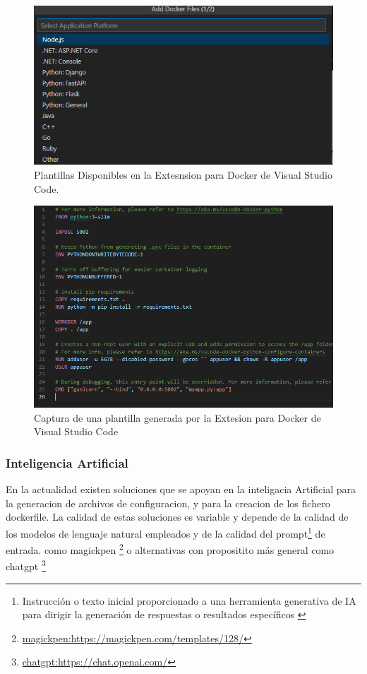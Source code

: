 \documentclass[12pt, a4paper, twoside]{article}
\begin{document}
\begin{figure}[ht]
	\centering
	  \includegraphics[width=1\textwidth]{Docker.extension.vscode.png}
	\caption{Plantillas Disponibles en la Extesnsion para Docker de Visual Studio Code.}
\end{figure}

\begin{figure}[ht]
	\centering
		\includegraphics[width=1\textwidth]{docker.extension.vscode.dockerfile.png}
	\caption{Captura de una plantilla generada por la Extesion para Docker de Visual Studio Code}
\end{figure}

\subsubsection{Inteligencia Artificial}
En la actualidad existen soluciones que se apoyan en la inteligacia Artificial para la generacion de archivos de configuracion, y para la creacion de los fichero dockerfile. 
La calidad de estas soluciones es variable y depende de la calidad de los modelos de lenguaje natural empleados y de la calidad del prompt\footnote{Instrucción o texto inicial proporcionado a una herramienta generativa de IA para dirigir la generación de respuestas o resultados específicos \cite{panamericanlatam_prompt_ia}} de entrada.
como magickpen \cite{magickpen_dockerfile_template} \footnote{\href{https://magickpen.com/templates/128/}{magickpen:https://magickpen.com/templates/128/}} o alternativas con propositito más general como chatgpt \cite{chatgpt} \footnote{\href{https://chat.openai.com/}{chatgpt:https://chat.openai.com/}}
\end{document}
